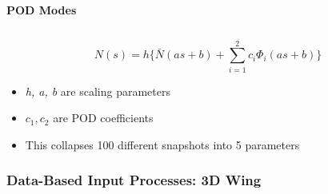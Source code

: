 \documentclass[9pt]{beamer}
\begin{document}
\begin{frame}
\begin{columns}[c]
    {\bf POD Modes}
\end{columns}
\vspace{1cm}
\begin{equation*}
N(s) = h \lbrace \bar{N}(as + b) + \sum_{i=1}^2 c_i \Phi_i(as + b)   \rbrace
\end{equation*}

\begin{itemize}
\item \emph{h, a, b} are scaling parameters
\item $c_1, c_2$ are POD coefficients
\item This collapses 100 different snapshots into 5 parameters
\end{itemize}
\end{frame}
\begin{frame}
\frametitle{Data-Based Input Processes: 3D Wing}
\label{sec-2-4}



\end{frame}
\end{document}
